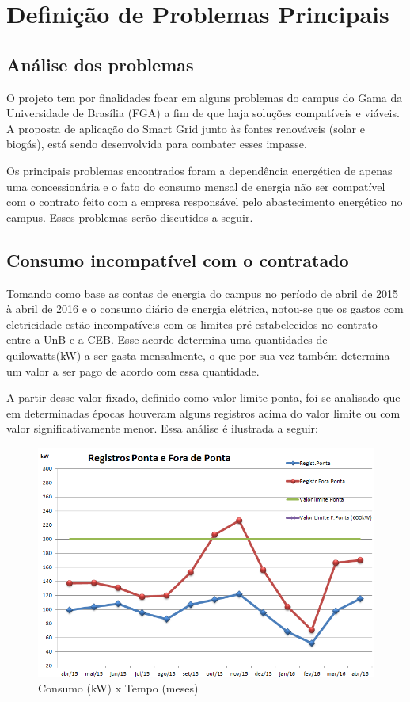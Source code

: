 
\section{Definição de Problemas Principais}

\subsection{Análise dos problemas}
O projeto tem por finalidades focar em alguns problemas do campus do Gama da Universidade de Brasília (FGA) a fim de que haja soluções compatíveis e viáveis. A proposta de aplicação do Smart Grid junto às fontes renováveis (solar e biogás), está sendo desenvolvida para combater esses impasse.
\par Os principais problemas encontrados foram  a dependência energética de apenas uma concessionária e o fato do consumo mensal de energia não ser compatível com o contrato feito com a empresa responsável pelo abastecimento energético no campus. Esses problemas serão discutidos a seguir.

\subsection {Consumo incompatível com o contratado} 
Tomando como base as contas de energia do campus no período de abril de 2015 à abril de 2016 e o consumo diário de energia elétrica, notou-se que os gastos com  eletricidade estão incompatíveis com os limites pré-estabelecidos no contrato entre a UnB e a CEB. Esse acorde determina uma quantidades de quilowatts(kW) a ser gasta mensalmente, o que por sua vez também determina um valor a ser pago de acordo com essa quantidade.
\par A partir desse valor fixado, definido como valor limite ponta, foi-se analisado que em determinadas épocas houveram alguns registros acima do valor limite ou com valor significativamente menor. Essa análise é ilustrada a seguir:
\begin{figure}[!htb]
\centering
\includegraphics[width=0.6\paperwidth]{figuras/graficopontas.png}
\caption{Consumo (kW) x Tempo (meses)}
\end{figure}

